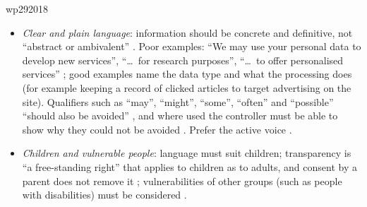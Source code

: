 \begin{papercard}{wp292018}
\begin{itemize}
\item \emph{Clear and plain language}: information should be concrete and definitive, not ``abstract or ambivalent'' . Poor examples: ``We may use your personal data to develop new services'', ``\ldots\ for research purposes'', ``\ldots\ to offer personalised services'' ; good examples name the data type and what the processing does (for example keeping a record of clicked articles to target advertising on the site). Qualifiers such as ``may'', ``might'', ``some'', ``often'' and ``possible'' ``should also be avoided'' , and where used the controller must be able to show why they could not be avoided . Prefer the active voice .
\item \emph{Children and vulnerable people}: language must suit children; transparency is ``a free-standing right'' that applies to children as to adults, and consent by a parent does not remove it ; vulnerabilities of other groups (such as people with disabilities) must be considered .
\end{itemize}


\end{papercard}
